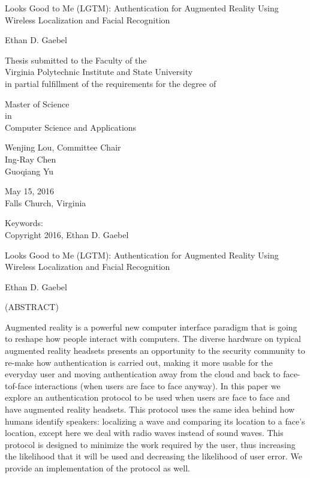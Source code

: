\documentclass[12pt]{report}
\begin{document}
\thispagestyle{empty}
\begin{center}

{\Large 
Looks Good to Me (LGTM): 
Authentication for Augmented Reality Using Wireless Localization and Facial Recognition
}

\vfill

Ethan D. Gaebel

\vfill

Thesis submitted to the Faculty of the \\
Virginia Polytechnic Institute and State University \\
in partial fulfillment of the requirements for the degree of

\vfill

Master of Science \\
in \\
Computer Science and Applications

\vfill

Wenjing Lou, Committee Chair \\
Ing-Ray Chen \\
Guoqiang Yu 

\vfill

May 15, 2016 \\
Falls Church, Virginia

\vfill

Keywords: 
\\
Copyright 2016, Ethan D. Gaebel

\end{center}

\pagebreak

\thispagestyle{empty}
\begin{center}

{\large Looks Good to Me (LGTM): 
Authentication for Augmented Reality Using Wireless Localization and Facial Recognition}

\vfill

Ethan D. Gaebel

\vfill

(ABSTRACT)

Augmented reality is a powerful new computer interface paradigm that is going to reshape how people interact with computers. The diverse hardware on typical augmented reality headsets presents an opportunity to the security community to re-make how authentication is carried out, making it more usable for the everyday user and moving authentication away from the cloud and back to face-tof-face interactions (when users are face to face anyway). In this paper we explore an authentication protocol to be used when users are face to face and have augmented reality headsets. This protocol uses the same idea behind how humans identify speakers: localizing a wave and comparing its location to a face's location, except here we deal with radio waves instead of sound waves. This protocol is designed to minimize the work required by the user, thus increasing the likelihood that it will be used and decreasing the likelihood of user error. We provide an implementation of the protocol as well.

\vfill

\end{center}
\end{document}
